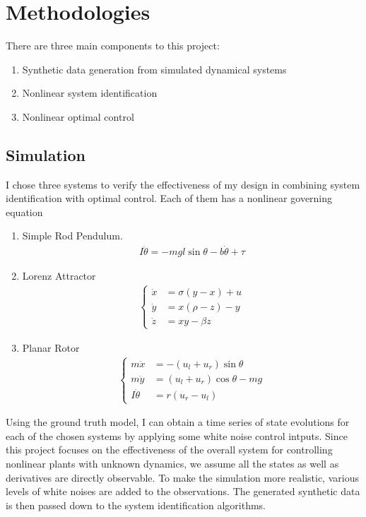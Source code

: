 \documentclass[10pt,twocolumn]{article}
\begin{document}
\section{Methodologies}

There are three main components to this project:
\begin{enumerate}
  \item Synthetic data generation from simulated dynamical systems
  \item Nonlinear system identification
  \item Nonlinear optimal control
\end{enumerate}

\subsection{Simulation}\label{sec:sim}

I chose three systems to verify the effectiveness of my design in combining
system identification with optimal control. Each of them has a nonlinear governing equation
\begin{enumerate}
  \item Simple Rod Pendulum.
    \begin{gather}\label{eqa:pendulum}
      I \ddot{\theta} = -mgl \sin{\theta} - b\dot{\theta} + \tau
    \end{gather}

  \item Lorenz Attractor
    \begin{gather}\label{eqa:lorenz}
      \left\{\begin{aligned}
        \dot{x} &= \sigma (y - x) + u \\
        \dot{y} &=x (\rho - z) - y \\
        \dot{z} &=xy - \beta z
      \end{aligned}\right.
    \end{gather}

  \item Planar Rotor
    \begin{gather}\label{eqa:rotor}
      \left\{\begin{aligned}
        m\ddot{x} &= -(u_l + u_r) \sin{\theta} \\
        m\ddot{y} &= (u_l + u_r) \cos{\theta} - mg \\
        I\ddot{\theta} &= r(u_r - u_l)
      \end{aligned}\right.
    \end{gather}
\end{enumerate}
Using the ground truth model, I can obtain a time series of state evolutions for
each of the chosen systems by applying some white noise control intputs. Since
this project focuses on the effectiveness of the overall system for controlling
nonlinear plants with unknown dynamics, we assume all the states as well as derivatives
are directly observable. To make the simulation more realistic, various levels of white noises
are added to the observations. The generated synthetic data is then passed down to
the system identification algorithms.
\end{document}
